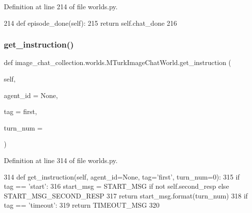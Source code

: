 Definition at line 214 of file worlds.\+py.


\begin{DoxyCode}
214     \textcolor{keyword}{def }episode\_done(self):
215         \textcolor{keywordflow}{return} self.chat\_done
216 
\end{DoxyCode}
\mbox{\label{classimage__chat__collection_1_1worlds_1_1MTurkImageChatWorld_ab3caeb29dc340a476579b1cc8d101608}} 
\subsubsection{\texorpdfstring{get\+\_\+instruction()}{get\_instruction()}}
{\footnotesize\ttfamily def image\+\_\+chat\+\_\+collection.\+worlds.\+M\+Turk\+Image\+Chat\+World.\+get\+\_\+instruction (\begin{DoxyParamCaption}\item[{}]{self,  }\item[{}]{agent\+\_\+id = {\ttfamily None},  }\item[{}]{tag = {\ttfamily \textquotesingle{}first\textquotesingle{}},  }\item[{}]{turn\+\_\+num = {} }\end{DoxyParamCaption})}



Definition at line 314 of file worlds.\+py.


\begin{DoxyCode}
314     \textcolor{keyword}{def }get\_instruction(self, agent\_id=None, tag='first', turn\_num=0):
315         \textcolor{keywordflow}{if} tag == \textcolor{stringliteral}{'start'}:
316             start\_msg = START\_MSG \textcolor{keywordflow}{if} \textcolor{keywordflow}{not} self.second\_resp \textcolor{keywordflow}{else} START\_MSG\_SECOND\_RESP
317             \textcolor{keywordflow}{return} start\_msg.format(turn\_num)
318         \textcolor{keywordflow}{if} tag == \textcolor{stringliteral}{'timeout'}:
319             \textcolor{keywordflow}{return} TIMEOUT\_MSG
320 
\end{DoxyCode}
\mbox{\label{classimage__chat__collection_1_1worlds_1_1MTurkImageChatWorld_a7af5e011cc93106144797115af770537}} 
